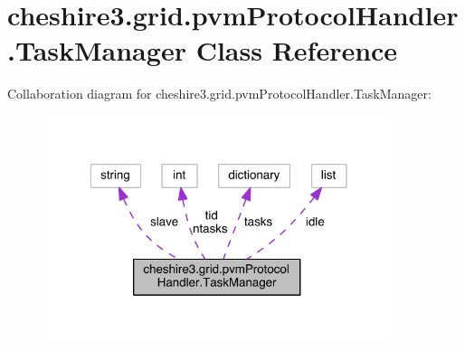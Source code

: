 \hypertarget{classcheshire3_1_1grid_1_1pvm_protocol_handler_1_1_task_manager}{\section{cheshire3.\-grid.\-pvm\-Protocol\-Handler.\-Task\-Manager Class Reference}
\label{classcheshire3_1_1grid_1_1pvm_protocol_handler_1_1_task_manager}
}


Collaboration diagram for cheshire3.\-grid.\-pvm\-Protocol\-Handler.\-Task\-Manager\-:
\nopagebreak
\begin{figure}[H]
\begin{center}
\leavevmode
\includegraphics[width=291pt]{classcheshire3_1_1grid_1_1pvm_protocol_handler_1_1_task_manager__coll__graph}
\end{center}
\end{figure}
